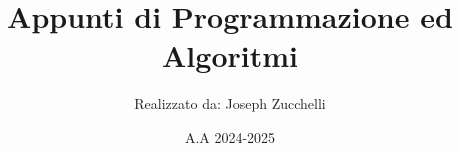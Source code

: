 \documentclass[12pt, a4paper]{article}
\theoremstyle{plain}
\theoremstyle{definition}
\begin{document}
\title{\textbf{Appunti di Programmazione ed Algoritmi}}
\author{Realizzato da: Joseph Zucchelli}
\date{A.A 2024-2025}
\maketitle
\tableofcontents

\maketitle
\newpage
\tableofcontents

\newpage













\end{document}
